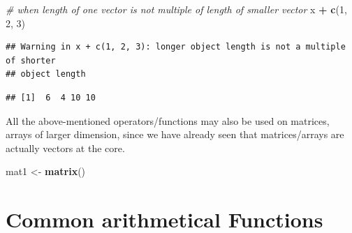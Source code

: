 \documentclass[
]{book}
\newenvironment{Shaded}{\begin{snugshade}}{\end{snugshade}}
\newcommand{\CommentTok}[1]{\textcolor[rgb]{0.56,0.35,0.01}{\textit{#1}}}
\newcommand{\DecValTok}[1]{\textcolor[rgb]{0.00,0.00,0.81}{#1}}
\newcommand{\FunctionTok}[1]{\textcolor[rgb]{0.13,0.29,0.53}{\textbf{#1}}}
\newcommand{\NormalTok}[1]{#1}
\newcommand{\OtherTok}[1]{\textcolor[rgb]{0.56,0.35,0.01}{#1}}
\newcommand{\SpecialCharTok}[1]{\textcolor[rgb]{0.81,0.36,0.00}{\textbf{#1}}}
\begin{document}
\begin{Shaded}
\begin{Highlighting}[]
\CommentTok{\# when length of one vector is not multiple of length of smaller vector}
\NormalTok{x }\SpecialCharTok{+} \FunctionTok{c}\NormalTok{(}\DecValTok{1}\NormalTok{, }\DecValTok{2}\NormalTok{, }\DecValTok{3}\NormalTok{)}
\end{Highlighting}
\end{Shaded}

\begin{verbatim}
## Warning in x + c(1, 2, 3): longer object length is not a multiple of shorter
## object length
\end{verbatim}

\begin{verbatim}
## [1]  6  4 10 10
\end{verbatim}

All the above-mentioned operators/functions may also be used on matrices, arrays of larger dimension, since we have already seen that matrices/arrays are actually vectors at the core.

\begin{Shaded}
\begin{Highlighting}[]
\NormalTok{mat1 }\OtherTok{\textless{}{-}} \FunctionTok{matrix}\NormalTok{()}
\end{Highlighting}
\end{Shaded}

\hypertarget{common-arithmetical-functions}{%
\section{Common arithmetical Functions}\label{common-arithmetical-functions}}
\end{document}

